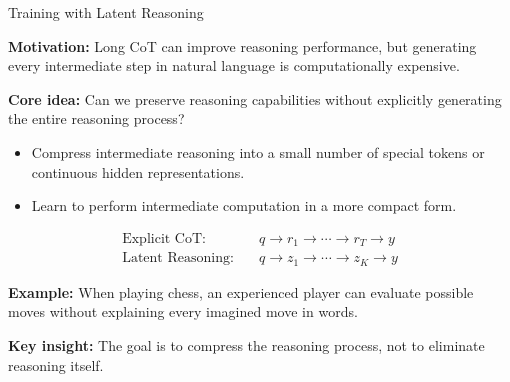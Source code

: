 \documentclass[aspectratio=169]{beamer}
\begin{document}
\begin{frame}{Training with Latent Reasoning}

\textbf{Motivation:} Long CoT can improve reasoning performance, but generating every intermediate step in natural language is computationally expensive.

\vspace{0.3cm}

\textbf{Core idea:} Can we preserve reasoning capabilities without explicitly generating the entire reasoning process?

\begin{itemize}
    \item Compress intermediate reasoning into a small number of special tokens or continuous hidden representations.

    \item Learn to perform intermediate computation in a more compact form.
\end{itemize}

\[
\begin{aligned}
\text{Explicit CoT:}\quad & q \rightarrow r_1 \rightarrow \cdots \rightarrow r_T \rightarrow y \\
\text{Latent Reasoning:}\quad & q \rightarrow z_1 \rightarrow \cdots \rightarrow z_K \rightarrow y
\end{aligned}
\]

\vspace{0.2cm}

\textbf{Example:} When playing chess, an experienced player can evaluate possible moves without explaining every imagined move in words.

\vspace{0.2cm}

\textbf{Key insight:} The goal is to compress the reasoning process, not to eliminate reasoning itself.

\end{frame}
\end{document}
